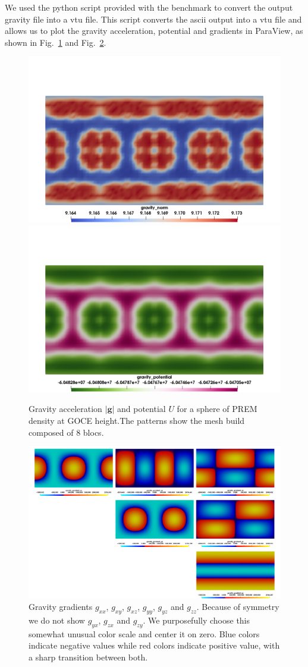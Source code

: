 We used the python script provided with the benchmark to convert the output gravity file into a vtu file. This script converts the ascii output into a vtu file and allows us to plot the gravity acceleration, potential and gradients in ParaView, as shown in Fig.~\ref{fig:gravitymapfull} and Fig.~\ref{fig:gravitymapfull2}. 

\begin{figure}[h!]
\centering
\includegraphics[width=0.48\linewidth]{../../benchmarks/gravity_prem/doc/prem_g_map.png}
\includegraphics[width=0.48\linewidth]{../../benchmarks/gravity_prem/doc/prem_U_map.png}
\caption{Gravity acceleration $|{\mathbf g}|$ and potential $U$  for a sphere of PREM density at GOCE height.The patterns show the mesh build composed of 8 blocs.}
\label{fig:gravitymapfull}
\end{figure}

\begin{figure}[h!]
\centering
\includegraphics[scale=0.64]{../../benchmarks/gravity_prem/doc/gradient_prem_map.jpg}
\caption{Gravity gradients $g_{xx}$, $g_{xy}$, $g_{xz}$, $g_{yy}$, $g_{yz}$ and $g_{zz}$. Because of symmetry we do not show $g_{yx}$, $g_{zx}$ and $g_{zy}$. We purposefully choose this somewhat unusual color scale and center it on zero. Blue colors indicate negative values while red colors indicate positive value, with a sharp transition between both.}
\label{fig:gravitymapfull2}
\end{figure}

